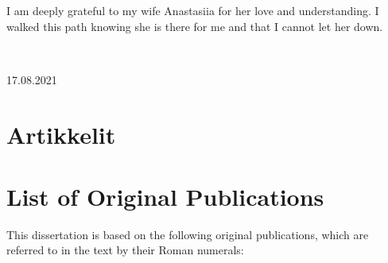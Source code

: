 I am deeply grateful to my wife Anastasiia for her love and understanding.
I walked this path knowing she is there for me and that I cannot let her down.

\mbox{}\\[2\baselineskip]
\begin{flushright}
17.08.2021 \\
\textit{\Author}
\end{flushright}
%
%
\mbox{}\newpage


\iffin
\def\contentsname{Sisällys}
\else
\def\contentsname{Table of Contents}
\fi
\tableofcontents

% 
%
{
\iffin
\printnoidxglossary[
    style=alttree,
    title=Lyhenteet,
    toctitle=Lyhenteet, 
    sort=word, 
    type=\acronymtype
]
\else
\printnoidxglossary[
    style=alttree,
    title=Abbreviations,
    toctitle=Abbreviations, 
    sort=word, 
    type=\acronymtype
]
\fi
}
\iffin
\chapter*{Artikkelit}
\else
\chapter*{List of Original Publications}
\fi
This dissertation is based on the following original publications, which
are referred to in the text by their Roman numerals:

